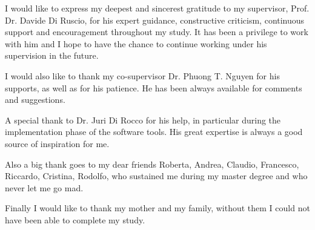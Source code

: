 \documentclass[
11pt, %
english, %
singlespacing, %
headsepline, %
]{MastersDoctoralThesis} %
\begin{document}


\vspace*{0.2\textheight}





\begin{acknowledgements}
\addchaptertocentry{\acknowledgementname} %

I would like to express my deepest and sincerest gratitude to my supervisor, Prof. Dr. Davide Di Ruscio, for his expert guidance, constructive criticism, continuous support and encouragement throughout my study. It has been a privilege to work with him and I hope to have the chance to continue working under his supervision in the future.

I would also like to thank my co-supervisor Dr. Phuong T. Nguyen for his supports, as well as for his patience. He has been always available for comments and suggestions.

A special thank to Dr. Juri Di Rocco for his help, in particular during the implementation phase of the software tools. His great expertise is always a good source of inspiration for me. %

Also a big thank goes to my dear friends Roberta, Andrea, Claudio, Francesco, Riccardo, Cristina, Rodolfo, who sustained me during my master degree and who never let me go mad.

Finally I would like to thank my mother and my family, without them I could not have been able to complete my study.

\end{acknowledgements}
\end{document}
